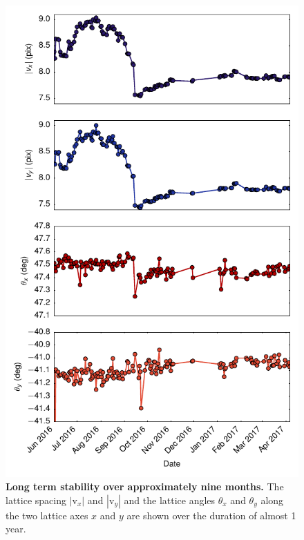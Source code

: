 \documentclass[twocolumn,aps,pra,showpacs,preprintnumbers,bibnotes]{revtex4-1}
\begin{document}
\begin{figure}
\begin{center}
    \includegraphics[width=\columnwidth]{fig/lattice_stability.pdf}
    \caption{\textbf{Long term stability over approximately nine months.} The lattice spacing $|\mathrm{v}_x|$ and $|\mathrm{v}_y|$ and the lattice angles $\theta_x$ and $\theta_y$ along the two lattice axes $x$ and $y$ are shown over the duration of almost 1 year. }\label{fig:long_term_stability}
  \end{center}
\end{figure}
\end{document}
